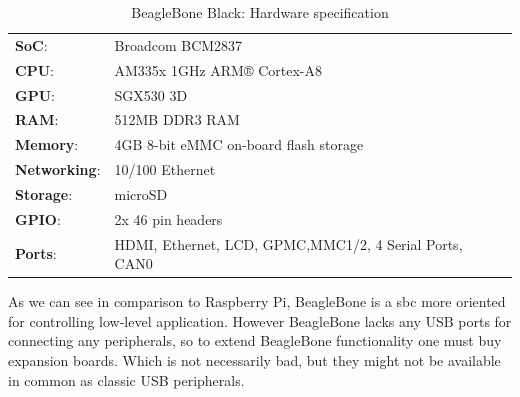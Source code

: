 \begin{table}[H]
 \begin{center}
   \begin{tabular}{l l}
   \hline
   	\textbf{SoC}: & Broadcom BCM2837\\
	\textbf{CPU}: & AM335x 1GHz ARM® Cortex-A8\\
	\textbf{GPU}: & SGX530 3D\\
	\textbf{RAM}: & 512MB DDR3 RAM\\
	\textbf{Memory}:& 4GB 8-bit eMMC on-board flash storage \\
	\textbf{Networking}: & 10/100 Ethernet\\
	\textbf{Storage}: & microSD\\
	\textbf{GPIO}: & 2x 46 pin headers\\
	\textbf{Ports}: & HDMI, Ethernet, LCD, GPMC,MMC1/2, 4 Serial Ports, CAN0 \\
   \hline
   \end{tabular}
 \end{center}
 \caption{BeagleBone Black: Hardware specification}
 \label{tab:tab18}
\end{table}
As we can see in comparison to Raspberry Pi, BeagleBone is a \gls{sbc} more oriented for controlling low-level application. However BeagleBone lacks any USB ports for connecting any peripherals, so to extend BeagleBone functionality one must buy expansion boards. Which is not necessarily bad, but they might not be available in common as classic USB peripherals.
